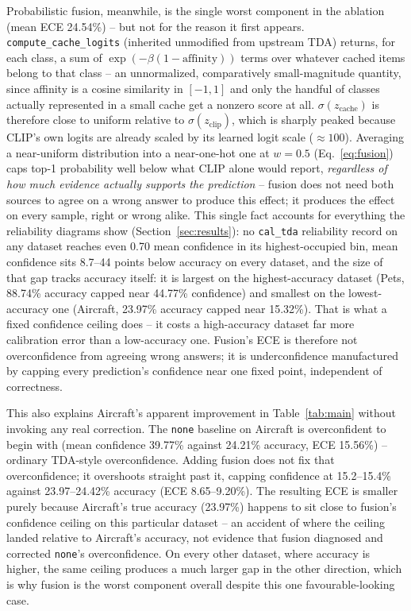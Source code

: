 Probabilistic fusion, meanwhile, is the single worst component in the ablation (mean ECE
24.54\%) -- but not for the reason it first appears. \texttt{compute\_cache\_logits}
(inherited unmodified from upstream TDA) returns, for each class, a sum of
$\exp(-\beta(1 - \mathrm{affinity}))$ terms over whatever cached items belong to that class --
an unnormalized, comparatively small-magnitude quantity, since affinity is a cosine similarity
in $[-1, 1]$ and only the handful of classes actually represented in a small cache get a
nonzero score at all. $\sigma(z_{\text{cache}})$ is therefore close to uniform relative to
$\sigma(z_{\text{clip}})$, which is sharply peaked because CLIP's own logits are already scaled
by its learned logit scale ($\approx 100$). Averaging a near-uniform distribution into a
near-one-hot one at $w = 0.5$ (Eq.~\eqref{eq:fusion}) caps top-1 probability well below what CLIP
alone would report, \emph{regardless of how much evidence actually supports the prediction} -- fusion
does not need both sources to agree on a wrong answer to produce this effect; it produces the effect on
every sample, right or wrong alike. This single fact accounts for everything the reliability
diagrams show (Section~\ref{sec:results}): no \texttt{cal\_tda} reliability record on any
dataset reaches even 0.70 mean confidence in its highest-occupied bin, mean confidence sits
8.7--44 points below accuracy on every dataset, and the size of that gap tracks accuracy itself:
it is largest on the highest-accuracy dataset (Pets, 88.74\% accuracy capped near 44.77\%
confidence) and smallest on the lowest-accuracy one (Aircraft, 23.97\% accuracy capped near
15.32\%). That is what a fixed confidence ceiling does -- it costs a high-accuracy dataset far
more calibration error than a low-accuracy one. Fusion's ECE is therefore not overconfidence from agreeing wrong
answers; it is underconfidence manufactured by capping every prediction's confidence near one
fixed point, independent of correctness.

This also explains Aircraft's apparent improvement in Table~\ref{tab:main} without invoking any
real correction. The \texttt{none} baseline on Aircraft is overconfident to begin with (mean
confidence 39.77\% against 24.21\% accuracy, ECE 15.56\%) -- ordinary TDA-style overconfidence.
Adding fusion does not fix that overconfidence; it overshoots straight past it, capping
confidence at 15.2--15.4\% against 23.97--24.42\% accuracy (ECE 8.65--9.20\%). The resulting
ECE is smaller purely because Aircraft's true accuracy (23.97\%) happens to sit close to
fusion's confidence ceiling on this particular dataset -- an accident of
where the ceiling landed relative to Aircraft's accuracy, not evidence that fusion diagnosed and
corrected \texttt{none}'s overconfidence. On every other dataset, where accuracy is higher, the
same ceiling produces a much larger gap in the other direction, which is why fusion is the worst
component overall despite this one favourable-looking case.

